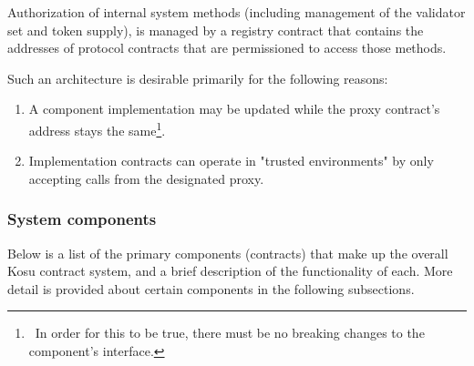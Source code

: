 \documentclass[10pt]{article}
\begin{document}
Authorization of internal system methods (including management of the validator set and token supply), is managed by a registry contract that contains the addresses of protocol contracts that are permissioned to access those methods.
\medskip

Such an architecture is desirable primarily for the following reasons:

\begin{enumerate}
  \item A component implementation may be updated while the proxy contract's address stays the same\footnote{\ In order for this to be true, there must be no breaking changes to the component's interface.}.
  \item Implementation contracts can operate in "trusted environments" by only accepting calls from the designated proxy.
\end{enumerate}

\subsubsection{System components}\label{ethereum-contract-system-components}
Below is a list of the primary components (contracts) that make up the overall Kosu contract system, and a brief description of the functionality of each. More detail is provided about certain components in the following subsections.
\end{document}
